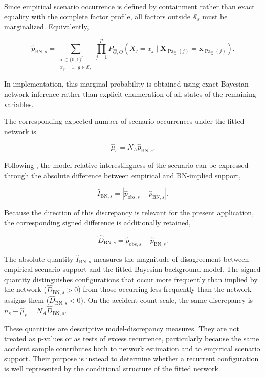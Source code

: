 Since empirical scenario occurrence is defined by containment rather than
exact equality with the complete factor profile, all factors outside
\(\mathcal S_s\) must be marginalized. Equivalently,

\[
\widehat p_{\mathrm{BN},s}
=
\sum_{\substack{
\mathbf x\in\{0,1\}^{p}\\
x_g=1,\;g\in\mathcal S_s}}
\prod_{j=1}^{p}
P_{\widehat G,\widetilde\Theta}
\left(
X_j=x_j
\mid
\mathbf X_{\operatorname{Pa}_{\widehat G}(j)}
=
\mathbf x_{\operatorname{Pa}_{\widehat G}(j)}
\right).
\]

In implementation, this marginal probability is obtained using exact
Bayesian-network inference rather than explicit enumeration of all states of
the remaining variables.

The corresponding expected number of scenario occurrences under the fitted
network is

\[
\widehat\mu_s
=
N_A\widehat p_{\mathrm{BN},s}.
\]

Following \citet{jaroszewicz2004interestingness}, the model-relative
interestingness of the scenario can be expressed through the absolute
difference between empirical and BN-implied support,

\[
\widehat I_{\mathrm{BN},s}
=
\left|
\widehat p_{\mathrm{obs},s}
-
\widehat p_{\mathrm{BN},s}
\right|.
\]

Because the direction of this discrepancy is relevant for the present
application, the corresponding signed difference is additionally retained,

\[
\widehat D_{\mathrm{BN},s}
=
\widehat p_{\mathrm{obs},s}
-
\widehat p_{\mathrm{BN},s}.
\]

The absolute quantity
\(\widehat I_{\mathrm{BN},s}\)
measures the magnitude of disagreement between empirical scenario support and
the fitted Bayesian background model. The signed quantity distinguishes
configurations that occur more frequently than implied by the network
(\(\widehat D_{\mathrm{BN},s}>0\)) from those occurring less frequently than
the network assigns them
(\(\widehat D_{\mathrm{BN},s}<0\)).
On the accident-count scale, the same discrepancy is
\(n_s-\widehat\mu_s
=
N_A\widehat D_{\mathrm{BN},s}\).

These quantities are descriptive model-discrepancy measures. They are not
treated as p-values or as tests of excess recurrence, particularly because
the same accident sample contributes both to network estimation and to
empirical scenario support. Their purpose is instead to determine whether a
recurrent configuration is well represented by the conditional structure of
the fitted network.

